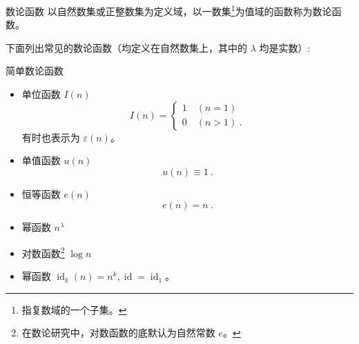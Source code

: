 

\begin{issues}
\issueDraft
\issueMissDepend
\end{issues}

\begin{definition}{数论函数}
以自然数集或正整数集为定义域，以一数集\footnote{指复数域的一个子集。}为值域的函数称为数论函数。
\end{definition}

下面列出常见的数论函数（均定义在自然数集上，其中的 $\lambda$ 均是实数）:
\begin{example}{简单数论函数}
\begin{itemize}
\item 单位函数 $I(n)$
\begin{equation}
I(n) =
\begin{cases}
1\quad (n = 1)\\
0\quad (n > 1)~.
\end{cases}
\end{equation}
有时也表示为 $\varepsilon(n)$。
\item 单值函数 $u(n)$
\begin{equation}
u(n)\equiv1~.
\end{equation}
\item 恒等函数 $e(n)$
\begin{equation}
e(n)=n~.
\end{equation}
\item 幂函数 $n^\lambda$
\item 对数函数\footnote{在数论研究中，对数函数的底默认为自然常数 $e$。} $\log n$
\item 幂函数 $\operatorname{id}_k(n) = n^k, \operatorname{id} = \operatorname{id}_1$。
\end{itemize}
\end{example}
